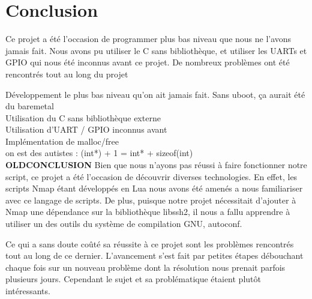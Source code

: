 \documentclass[frenchb]{article}
\begin{document}
\clearpage

\section*{Conclusion}

\noindent Ce projet a été l'occasion de programmer plus bas niveau que nous ne l'avons jamais fait. Nous avons pu utiliser le C sans bibliothèque, et utiliser les UARTs et GPIO qui nous été inconnus avant ce projet.
De nombreux problèmes ont été rencontrés tout au long du projet

Développement le plus bas niveau qu'on ait jamais fait. Sans uboot, ça aurait été du baremetal\\
Utilisation du C sans bibliothèque externe\\
Utilisation d'UART / GPIO inconnus avant\\
Implémentation de malloc/free\\
on est des autistes : (int*) + 1 = int* + sizeof(int)\\


{\Large\textbf{OLDCONCLUSION}}
Bien que nous n'ayons pas réussi à faire fonctionner notre script, ce projet a été l'occasion de découvrir diverses technologies. En effet, les scripts Nmap étant développés en Lua nous avons été amenés a nous familiariser avec ce langage de scripts. De plus, puisque notre projet nécessitait d'ajouter à Nmap une dépendance sur la bibliothèque \textsf{libssh2}, il nous a fallu apprendre à utiliser un des outils du système de compilation GNU, \textsf{autoconf}. 

Ce qui a sans doute coûté sa réussite à ce projet sont les problèmes rencontrés tout au long de ce dernier. L'avancement s'est fait par petites étapes débouchant chaque fois sur un nouveau problème dont la résolution nous prenait parfois plusieurs jours. Cependant le sujet et sa problématique étaient plutôt intéressants.
\end{document}

